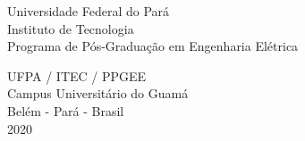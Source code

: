   \begin{capa}
    \center
	\large{Universidade Federal do Par\'a \\ 
	Instituto de Tecnologia\\ 
	Programa de P\'os-Gradua\c{c}\~ao em Engenharia Elétrica}

    \vfill
    {\ABNTEXchapterfont\LARGE\textbf{\imprimirtitulo}}
    \vfill

	{\large\imprimirautor}
	\vfill

	\large{UFPA / ITEC / PPGEE \\
	Campus Universitário do Guamá \\
	Belém - Pará - Brasil \\
	2020}

    \vspace*{1cm}
  \end{capa}
